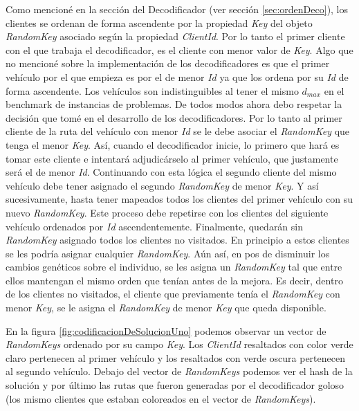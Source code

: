Como mencioné en la sección del Decodificador (ver sección \ref{sec:ordenDeco}), los clientes se ordenan de forma ascendente por la propiedad \textit{Key} del objeto \textit{RandomKey} asociado según la propiedad \textit{ClientId}. Por lo tanto el primer cliente con el que trabaja el decodificador, es el cliente con menor valor de \textit{Key}. Algo que no mencioné sobre la implementación de los decodificadores es que el primer vehículo por el que empieza es por el de menor \textit{Id} ya que los ordena por su \textit{Id} de forma ascendente. Los vehículos son indistinguibles al tener el mismo $d_{max}$ en el benchmark de instancias de problemas. De todos modos ahora debo respetar la decisión que tomé en el desarrollo de los decodificadores. Por lo tanto al primer cliente de la ruta del vehículo con menor \textit{Id} se le debe asociar el \textit{RandomKey} que tenga el menor \textit{Key}. Así, cuando el decodificador inicie, lo primero que hará es tomar este cliente e intentará adjudicárselo al primer vehículo, que justamente será el de menor \textit{Id}. Continuando con esta lógica el segundo cliente del mismo vehículo debe tener asignado el segundo \textit{RandomKey} de menor \textit{Key}. Y así sucesivamente, hasta tener mapeados todos los clientes del primer vehículo con su nuevo \textit{RandomKey}. Este proceso debe repetirse con los clientes del siguiente vehículo ordenados por \textit{Id} ascendentemente. Finalmente, quedarán sin \textit{RandomKey} asignado todos los clientes no visitados. En principio a estos clientes se les podría asignar cualquier \textit{RandomKey}. Aún así, en pos de disminuir los cambios genéticos sobre el individuo, se les asigna un \textit{RandomKey} tal que entre ellos mantengan el mismo orden que tenían antes de la mejora. Es decir, dentro de los clientes no visitados, el cliente que previamente tenía el \textit{RandomKey} con menor \textit{Key}, se le asigna el \textit{RandomKey} de menor \textit{Key} que queda disponible. 

\bigskip

En la figura \ref{fig:codificacionDeSolucionUno} podemos observar un vector de \textit{RandomKeys} ordenado por su campo \textit{Key}. Los \textit{ClientId} resaltados con color verde claro pertenecen al primer vehículo y los resaltados con verde oscura pertenecen al segundo vehículo. Debajo del vector de \textit{RandomKeys} podemos ver el hash de la solución y por último las rutas que fueron generadas por el decodificador goloso (los mismo clientes que estaban coloreados en el vector de \textit{RandomKeys}).

